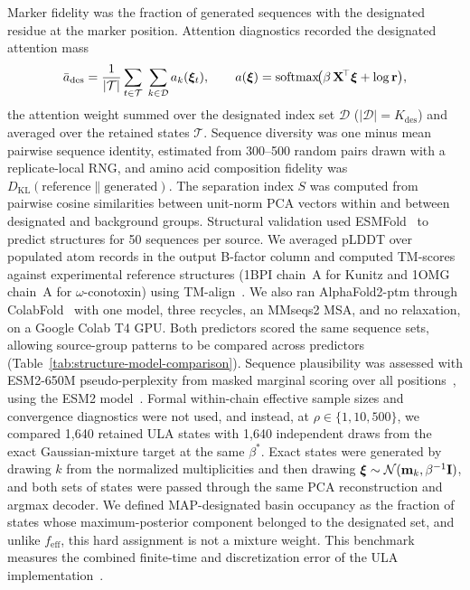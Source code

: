Marker fidelity was the fraction of generated sequences with the designated residue at the
marker position. Attention diagnostics recorded the designated attention mass
\begin{equation}\label{eq:a-des}
  \bar{a}_{\mathrm{des}}
  = \frac{1}{|\mathcal{T}|}\sum_{t \in \mathcal{T}}\;\sum_{k \in \mathcal{D}} a_k(\bm{\xi}_t),
  \qquad
  a(\bm{\xi}) = \operatorname{softmax}\!\bigl(\beta\,\mathbf{X}^{\!\top}\bm{\xi} + \log\mathbf{r}\bigr),
\end{equation}
the attention weight summed over the designated index set $\mathcal{D}$
($|\mathcal{D}| = K_{\mathrm{des}}$) and averaged over the retained states $\mathcal{T}$.
Sequence diversity was one minus mean pairwise sequence identity, estimated from 300--500
random pairs drawn with a replicate-local RNG, and amino acid composition fidelity was
$D_{\mathrm{KL}}(\text{reference}\parallel\text{generated})$. The separation
index $S$ was computed from pairwise cosine similarities between unit-norm PCA vectors within
and between designated and background groups. Structural validation used
ESMFold~\cite{esmfold2022} to predict structures for 50 sequences per source. We averaged
pLDDT over populated atom records in the output B-factor column and computed TM-scores against experimental reference
structures (1BPI chain~A for Kunitz and 1OMG chain~A for $\omega$-conotoxin) using
TM-align~\cite{tmAlign2005}. We also ran AlphaFold2-ptm through
ColabFold~\cite{jumperHighlyAccurate2021,mirdita2022colabfold} with one model, three recycles,
an MMseqs2 MSA, and no relaxation, on a Google Colab T4 GPU. Both predictors scored the same
sequence sets, allowing source-group patterns to be compared across predictors
(Table~\ref{tab:structure-model-comparison}). Sequence
plausibility was assessed with ESM2-650M pseudo-perplexity from masked marginal scoring over all
positions~\cite{meierZeroShot2021}, using the ESM2 model~\cite{esmfold2022}. Formal within-chain effective sample sizes and convergence
diagnostics were not used, and instead, at $\rho\in\{1,10,500\}$, we compared
1{,}640 retained ULA states with 1{,}640 independent draws from the exact
Gaussian-mixture target at the same $\beta^{*}$. Exact states were generated by drawing
$k$ from the normalized multiplicities and then drawing
$\bm{\xi}\sim\mathcal{N}(\mathbf{m}_k,\beta^{-1}\mathbf{I})$, and both sets of states were passed
through the same PCA reconstruction and argmax decoder. We defined MAP-designated basin
occupancy as the fraction of states whose maximum-posterior component belonged to the
designated set, and unlike $f_{\mathrm{eff}}$, this hard assignment is not a mixture weight.
This benchmark measures the combined finite-time and discretization error of the ULA
implementation~\cite{durmusMoulinesULA2017}.

